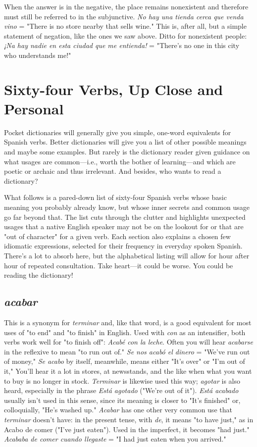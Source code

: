 \documentclass[14pt,a4paper,oneside]{memoir}
\begin{document}
When the answer is in the negative, the place remains nonexistent and therefore must still be referred to in the subjunctive. \emph{No hay
	una tienda cerca que venda vino} = "There is no store nearby that
sells wine." This is, after all, but a simple statement of negation, like
the ones we saw above. Ditto for nonexistent people: \emph{¡Na hay nadie en
	esta ciudad que me entienda!} = "There's no one in this city who understands me!"

\chapter{Sixty-four Verbs, Up Close and Personal}

Pocket dictionaries will generally give you simple, one-word
equivalents for Spanish verbs. Better dictionaries will give you a list of
other possible meanings and maybe some examples. But rarely is the
dictionary reader given guidance on what usages are common---i.e.,
worth the bother of learning---and which are poetic or archaic and thus
irrelevant. And besides, who wants to read a dictionary?

What follows is a pared-down list of sixty-four Spanish verbs
whose basic meaning you probably already know, but whose inner secrets and common usage go far beyond that. The list cuts through the
clutter and highlights unexpected usages that a native English speaker
may not be on the lookout for or that are "out of character" for a given
verb. Each section also explains a chosen few idiomatic expressions,
selected for their frequency in everyday spoken Spanish. There's a lot
to absorb here, but the alphabetical listing will allow for hour after
hour of repeated consultation. Take heart---it could be worse. You
could be reading the dictionary!

\section{\emph{acabar}}

This is a synonym for \emph{terminar} and, like that word, is a good
equivalent for most uses of "to end" and "to finish" in English. Used
with \emph{con} as an intensifier, both verbs work well for "to finish off":
\emph{Acabé con la leche}. Often you will hear \emph{acabarse} in the reflexive to
mean "to run out of." \emph{Se nos acabó el dinero} = "We've run out of
money," \emph{Se acabo} by itself, meanwhile, means either "It's over" or
"I'm out of it," You'll hear it a lot in stores, at newsstands, and the like
when what you want to buy is no longer in stock. \emph{Terminar} is likewise
used this way; \emph{agotar} is also heard, especially in the phrase \emph{Está agotado} ("We're out of it"). \emph{Está acabado} usually isn't used in this sense,
since its meaning is closer to "It's finished" or, colloquially, "He's
washed up." \emph{Acabar} has one other very common use that \emph{terminar}
doesn't have: in the present tense, with \emph{de}, it means "to have just,"
as in Acabo de comer ("I've just eaten"). Used in the imperfect, it becomes "had just." \emph{Acababa de comer cuando llegaste} = "I had just
eaten when you arrived."
\end{document}
